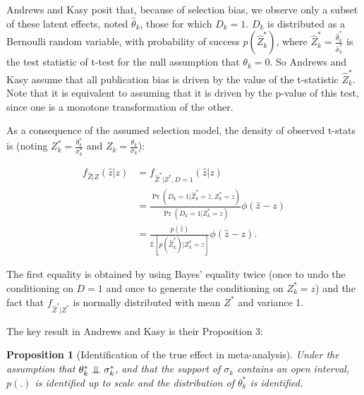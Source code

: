 \documentclass[
]{book}
\newcommand{\esp}[1]{\mathbb{E}[ #1 ]}
\newcommand\Ind{\protect\mathpalette{\protect\independenT}{\perp}}
\def\independenT#1#2{\mathrel{\setbox0\hbox{$#1#2$}\copy0\kern-\wd0\mkern4mu\box0}}
\newtheorem{proposition}{Proposition}[chapter]
\theoremstyle{definition}
\theoremstyle{definition}
\theoremstyle{definition}
\theoremstyle{definition}
\theoremstyle{remark}
\begin{document}
Andrews and Kasy posit that, because of selection bias, we observe only a subset of these latent effects, noted \(\hat{\theta}_k\), those for which \(D_k=1\).
\(D_k\) is distributed as a Bernoulli random variable, with probability of success \(p(\hat{Z}_k^*)\), where \(\hat{Z}_k^*=\frac{\hat{\theta}^*_k}{\hat{\sigma}^{*}_k}\) is the test statistic of t-test for the null assumption that \(\theta_k=0\).
So Andrews and Kasy assume that all publication bias is driven by the value of the t-statistic \(\hat{Z}_k^*\).
Note that it is equivalent to assuming that it is driven by the p-value of this test, since one is a monotone transformation of the other.

As a consequence of the assumed selection model, the density of observed t-stats is (noting \(Z_k^*=\frac{\theta^*_k}{\sigma^{*}_k}\) and \(Z_k=\frac{\theta_k}{\sigma_k}\)):

\begin{align*}
  f_{\hat{Z}|Z}(\hat{z}|z) & = f_{\hat{Z}^*|Z^*,D=1}(\hat{z}|z)\\
                           & = \frac{\Pr(D_k=1|\hat{Z}_k^*=\hat{z},Z_k^*=z)}{\Pr(D_k=1|Z_k^*=z)}\phi(\hat{z}-z)\\
                           & = \frac{p(\hat{z})}{\esp{p(\hat{Z}^*_k)|Z_k^*=z}}\phi(\hat{z}-z).
\end{align*}

The first equality is obtained by using Bayes' equality twice (once to undo the conditioning on \(D=1\) and once to generate the conditioning on \(Z^*_k=z\)) and the fact that \(f_{\hat{Z}^*|Z^*}\) is normally distributed with mean \(Z^*\) and variance 1.

The key result in Andrews and Kasy is their Proposition 3:

\begin{proposition}[Identification of the true effect in meta-analysis]
\protect\hypertarget{prp:AKident}{}{\label{prp:AKident} \iffalse (Identification of the true effect in meta-analysis) \fi{} }Under the assumption that \(\theta^*_k\Ind\sigma^*_k\), and that the support of \(\sigma_k\) contains an open interval, \(p(.)\) is identified up to scale and the distribution of \(\theta^*_k\) is identified.
\end{proposition}
\end{document}
